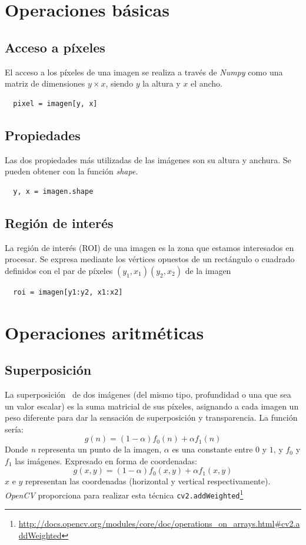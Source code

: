 \section{Operaciones básicas}
\subsection{Acceso a píxeles}
El acceso a los píxeles de una imagen se realiza a través de
\emph{Numpy} como una matriz de dimensiones $y \times x$, siendo $y$
la altura y $x$ el ancho.
\begin{verbatim}
  pixel = imagen[y, x]
\end{verbatim}

\subsection{Propiedades}
Las dos propiedades más utilizadas de las imágenes son su altura y
anchura.  Se pueden obtener con la función \emph{shape}.
\begin{verbatim}
  y, x = imagen.shape
\end{verbatim}

\subsection{Región de interés}\label{tecnica:roi}
La región de interés (ROI) de una imagen es la zona que estamos
interesados en procesar. Se expresa mediante los vértices opuestos de
un rectángulo o cuadrado definidos con el par de píxeles
$\left(y_1,x_1\right)\left(y_2,x_2\right)$ de la imagen
\begin{verbatim}
  roi = imagen[y1:y2, x1:x2]
\end{verbatim}

\section{Operaciones aritméticas}
\subsection{Superposición}
La superposición\emph{~\citep[3.1.1 Pixel transforms, 3.1.3
  Compositing and matting]{szeliski2010computer}} de dos imágenes (del
mismo tipo, profundidad o una que sea un valor escalar) es la suma
matricial de sus píxeles, asignando a cada imagen un peso diferente
para dar la sensación de superposición y transparencia. La función
sería:
\begin{equation*}
  g(n) = (1 - \alpha)f_0(n) + \alpha f_1(n)
\end{equation*}
Donde \emph{n} representa un punto de la imagen, \emph{$\alpha$} es una
constante entre $0$ y $1$, y \emph{$f_0$} y \emph{$f_1$} las imágenes.
Expresado en forma de coordenadas:
\begin{equation*}
  g(x, y) = (1 - \alpha)f_0(x, y) + \alpha f_1(x, y)
\end{equation*}
$x$ e $y$ representan las coordenadas (horizontal y vertical
respectivamente). \emph{OpenCV} proporciona para realizar esta técnica
\texttt{cv2.addWeighted}\footnote{\url{http://docs.opencv.org/modules/core/doc/operations_on_arrays.html\#cv2.addWeighted}}


